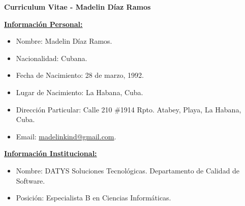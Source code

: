 \documentclass[letterpaper, 12pt, final]{report}
\begin{document}
\begin{center}
	\textbf{Curriculum Vitae - Madelin Díaz Ramos}
\end{center}

\vskip 0.5cm

%


\underline{\textbf{Información Personal:}}

\begin{itemize}[noitemsep, nolistsep]
	
	\item Nombre: Madelin Díaz Ramos.
	\item Nacionalidad: Cubana.
	\item Fecha de Nacimiento: 28 de marzo, 1992.
	\item Lugar de Nacimiento: La Habana, Cuba.
	\item Dirección Particular: Calle 210 \#1914 Rpto. Atabey, Playa, La Habana, Cuba.
	\item Email: \href{mailto: madelinkind@gmail.com}{madelinkind@gmail.com}.\\
	

\end{itemize}


\underline{\textbf{Información Institucional:}}

\begin{itemize}[noitemsep, nolistsep]
	
	\item Nombre: DATYS Soluciones Tecnológicas. Departamento de Calidad de Software.
	\item Posición: Especialista B en Ciencias Informáticas.\\
	

\end{itemize}
\end{document}
